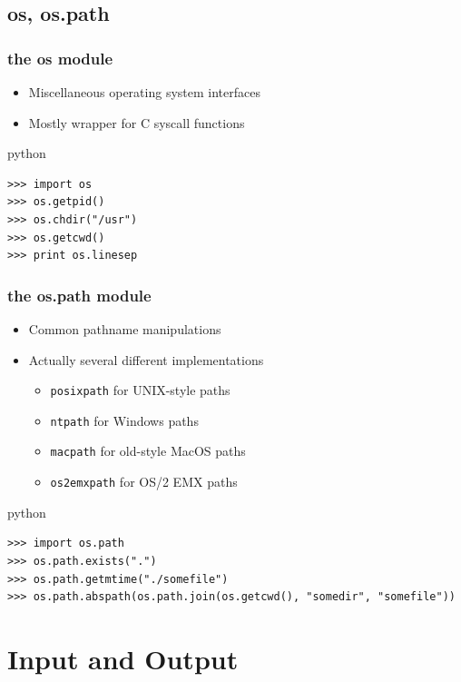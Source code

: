 \documentclass{beamer}
\begin{document}
\subsection{os, os.path} 
\begin{frame}[fragile]
	\frametitle{the os module}
	\begin{itemize}
	\item Miscellaneous operating system interfaces
	\item Mostly wrapper for C syscall functions
	\end{itemize}
	\begin{exampleblock}{python}
	\begin{lstlisting}
>>> import os
>>> os.getpid()
>>> os.chdir("/usr")
>>> os.getcwd()
>>> print os.linesep
	\end{lstlisting}
	\end{exampleblock}
\end{frame}

\begin{frame}[fragile]
	\frametitle{the os.path module}
	
	\begin{itemize}
	\item Common pathname manipulations
	\item Actually several different implementations
	\begin{itemize}
		\item \texttt{posixpath} for UNIX-style paths
		\item \texttt{ntpath} for Windows paths
		\item \texttt{macpath} for old-style MacOS paths
		\item \texttt{os2emxpath} for OS/2 EMX paths
	\end{itemize}
	\end{itemize}
	
	\begin{exampleblock}{python}
	\begin{lstlisting}
>>> import os.path
>>> os.path.exists(".")
>>> os.path.getmtime("./somefile")
>>> os.path.abspath(os.path.join(os.getcwd(), "somedir", "somefile"))
	\end{lstlisting}
	\end{exampleblock}
\end{frame}

\section{Input and Output}
\end{document}
